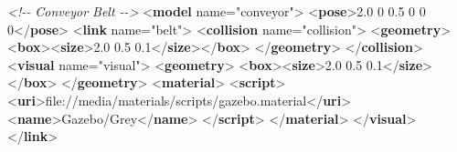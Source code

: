 \documentclass[
]{article}
\newenvironment{Shaded}{\begin{snugshade}}{\end{snugshade}}
\newcommand{\CommentTok}[1]{\textcolor[rgb]{0.56,0.35,0.01}{\textit{#1}}}
\newcommand{\KeywordTok}[1]{\textcolor[rgb]{0.13,0.29,0.53}{\textbf{#1}}}
\newcommand{\NormalTok}[1]{#1}
\newcommand{\OtherTok}[1]{\textcolor[rgb]{0.56,0.35,0.01}{#1}}
\newcommand{\StringTok}[1]{\textcolor[rgb]{0.31,0.60,0.02}{#1}}
\begin{document}
\begin{Shaded}
\begin{Highlighting}[]
    \CommentTok{\textless{}!{-}{-} Conveyor Belt {-}{-}\textgreater{}}
\NormalTok{    \textless{}}\KeywordTok{model}\OtherTok{ name=}\StringTok{"conveyor"}\NormalTok{\textgreater{}}
\NormalTok{      \textless{}}\KeywordTok{pose}\NormalTok{\textgreater{}2.0 0 0.5 0 0 0\textless{}/}\KeywordTok{pose}\NormalTok{\textgreater{}}
\NormalTok{      \textless{}}\KeywordTok{link}\OtherTok{ name=}\StringTok{"belt"}\NormalTok{\textgreater{}}
\NormalTok{        \textless{}}\KeywordTok{collision}\OtherTok{ name=}\StringTok{"collision"}\NormalTok{\textgreater{}}
\NormalTok{          \textless{}}\KeywordTok{geometry}\NormalTok{\textgreater{}}
\NormalTok{            \textless{}}\KeywordTok{box}\NormalTok{\textgreater{}\textless{}}\KeywordTok{size}\NormalTok{\textgreater{}2.0 0.5 0.1\textless{}/}\KeywordTok{size}\NormalTok{\textgreater{}\textless{}/}\KeywordTok{box}\NormalTok{\textgreater{}}
\NormalTok{          \textless{}/}\KeywordTok{geometry}\NormalTok{\textgreater{}}
\NormalTok{        \textless{}/}\KeywordTok{collision}\NormalTok{\textgreater{}}
\NormalTok{        \textless{}}\KeywordTok{visual}\OtherTok{ name=}\StringTok{"visual"}\NormalTok{\textgreater{}}
\NormalTok{          \textless{}}\KeywordTok{geometry}\NormalTok{\textgreater{}}
\NormalTok{            \textless{}}\KeywordTok{box}\NormalTok{\textgreater{}\textless{}}\KeywordTok{size}\NormalTok{\textgreater{}2.0 0.5 0.1\textless{}/}\KeywordTok{size}\NormalTok{\textgreater{}\textless{}/}\KeywordTok{box}\NormalTok{\textgreater{}}
\NormalTok{          \textless{}/}\KeywordTok{geometry}\NormalTok{\textgreater{}}
\NormalTok{          \textless{}}\KeywordTok{material}\NormalTok{\textgreater{}}
\NormalTok{            \textless{}}\KeywordTok{script}\NormalTok{\textgreater{}}
\NormalTok{              \textless{}}\KeywordTok{uri}\NormalTok{\textgreater{}file://media/materials/scripts/gazebo.material\textless{}/}\KeywordTok{uri}\NormalTok{\textgreater{}}
\NormalTok{              \textless{}}\KeywordTok{name}\NormalTok{\textgreater{}Gazebo/Grey\textless{}/}\KeywordTok{name}\NormalTok{\textgreater{}}
\NormalTok{            \textless{}/}\KeywordTok{script}\NormalTok{\textgreater{}}
\NormalTok{          \textless{}/}\KeywordTok{material}\NormalTok{\textgreater{}}
\NormalTok{        \textless{}/}\KeywordTok{visual}\NormalTok{\textgreater{}}
\NormalTok{      \textless{}/}\KeywordTok{link}\NormalTok{\textgreater{}}


\end{Highlighting}
\end{Shaded}
\end{document}
